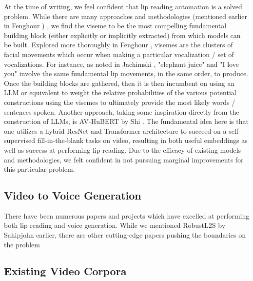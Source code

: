 \documentclass[10pt,twocolumn,letterpaper]{article}
\begin{document}
At the time of writing, we feel confident that lip reading automation is a solved problem. While there are many approaches and methodologies (mentioned earlier in Fenghour  \cite{Fenghour2021}) , we find the viseme to be the most compelling fundamental building block (either explicitly or implicitly extracted) from which models can be built. Explored more thoroughly in Fenghour \cite{Fenghour2023}, visemes are the clusters of facial movements which occur when making a particular vocalization / set of vocalizations. For instance, as noted in Jachimski  \cite{Elephant2017} , "elephant juice" and "I love you" involve the same fundamental lip movements, in the same order, to produce. Once the building blocks are gathered, then it is then incumbent on using an LLM or equivalent to weight the relative probabilities of the various potential constructions using the visemes to ultimately provide the most likely words / sentences spoken. Another approach, taking some inspiration directly from the construction of LLMs, is AV-HuBERT by Shi  \cite{AVHuBert}. The fundamental idea here is that one utilizes a hybrid ResNet and Transformer architecture to succeed on a self-supervised fill-in-the-blank tasks on video, resulting in both useful embeddings as well as success at performing lip reading. Due to the efficacy of existing models and methodologies, we felt confident in not pursuing marginal improvements for this particular problem.

\subsection{Video to Voice Generation}

There have been numerous papers and projects which have excelled at performing both lip reading and voice generation. While we mentioned RobustL2S by Sahipjohn \etal \cite{RobustL2S} earlier, there are other cutting-edge papers pushing the boundaries on the problem  

\subsection{Existing Video Corpora}
\end{document}
